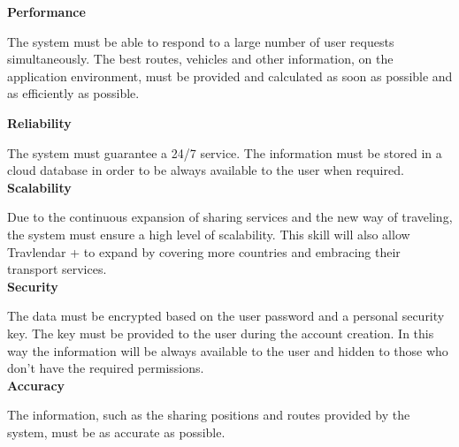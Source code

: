 \vspace{0.5cm}
\textbf{Performance}\par
\vspace{0.2cm}
The system must be able to respond to a large number of user requests simultaneously. The best routes, vehicles and other information, on the application environment, must be provided and calculated as soon as possible and as efficiently as possible.
\newpage

\indent \textbf{Reliability}
\vspace{0.2cm}\par
The system must guarantee a 24/7 service. The information must be stored in a cloud database in order to be always available to the user when required.
\vspace{0.5cm}\\

\indent \textbf{Scalability}
\vspace{0.2cm}\par
Due to the continuous expansion of sharing services and the new way of traveling, the system must ensure a high level of scalability. This skill will also allow Travlendar + to expand by covering more countries and embracing their transport services.
\vspace{0.5cm}\\

\indent \textbf{Security}
\vspace{0.2cm}\par
The data must be encrypted based on the user password and a personal security key. The key must be provided to the user during the account creation. In this way the information will be always available to the user and hidden to those who don’t have the required permissions.
\vspace{0.5cm}\\

\indent \textbf{Accuracy}
\vspace{0.2cm}\par
The information, such as the sharing positions and routes provided by the system, must be as accurate as possible.
